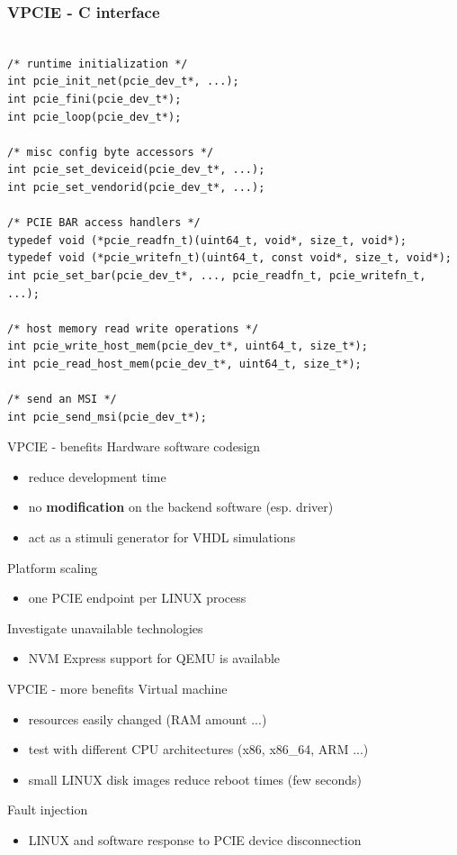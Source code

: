 \documentclass{beamer}
\begin{document}
\begin{frame}[containsverbatim]
 \frametitle{VPCIE - C interface}
 \begin{tiny}
 \lstset{language=C}
 \begin{lstlisting}[frame=tb]

/* runtime initialization */
int pcie_init_net(pcie_dev_t*, ...);
int pcie_fini(pcie_dev_t*);
int pcie_loop(pcie_dev_t*);

/* misc config byte accessors */
int pcie_set_deviceid(pcie_dev_t*, ...);
int pcie_set_vendorid(pcie_dev_t*, ...);

/* PCIE BAR access handlers */
typedef void (*pcie_readfn_t)(uint64_t, void*, size_t, void*);
typedef void (*pcie_writefn_t)(uint64_t, const void*, size_t, void*);
int pcie_set_bar(pcie_dev_t*, ..., pcie_readfn_t, pcie_writefn_t, ...);

/* host memory read write operations */
int pcie_write_host_mem(pcie_dev_t*, uint64_t, size_t*);
int pcie_read_host_mem(pcie_dev_t*, uint64_t, size_t*);

/* send an MSI */
int pcie_send_msi(pcie_dev_t*);
 \end{lstlisting}
 \end{tiny}
\end{frame}

\begin{frame}{VPCIE - benefits}
  Hardware software codesign
  \begin{itemize}
  \item reduce development time
  \item no \textbf{modification} on the backend software (esp. driver)
  \item act as a stimuli generator for VHDL simulations
  \end{itemize}

  Platform scaling
  \begin{itemize}
  \item one PCIE endpoint per LINUX process
  \end{itemize}

  Investigate unavailable technologies
  \begin{itemize}
  \item NVM Express support for QEMU is available
  \end{itemize}
\end{frame}

\begin{frame}{VPCIE - more benefits}
  Virtual machine
  \begin{itemize}
  \item resources easily changed (RAM amount ...)
  \item test with different CPU architectures (x86, x86\_64, ARM ...)
  \item small LINUX disk images reduce reboot times (few seconds)
  \end{itemize}
  Fault injection
  \begin{itemize}
  \item LINUX and software response to PCIE device disconnection
  \end{itemize}
\end{frame}
\end{document}
